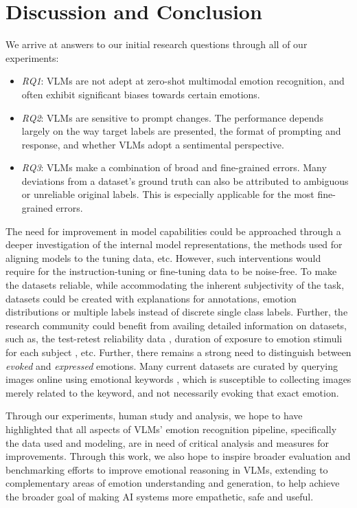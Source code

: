 \section{Discussion and Conclusion}
\label{sec:discussion}

We arrive at answers to our initial research questions through all of our experiments: 

\begin{itemize}
    \item \textit{RQ1}: VLMs are not adept at zero-shot multimodal emotion recognition, and often exhibit significant biases towards certain emotions.
    \item \textit{RQ2}: VLMs are sensitive to prompt changes. The performance depends largely on the way target labels are presented, the format of prompting and response, and whether VLMs adopt a sentimental perspective. 
    \item \textit{RQ3}: VLMs make a combination of broad and fine-grained errors. Many deviations from a dataset's ground truth can also be attributed to ambiguous or unreliable original labels. This is especially applicable for the most fine-grained errors. 
\end{itemize}

The need for improvement in model capabilities could be approached through a deeper investigation of the internal model representations, the methods used for aligning models to the tuning data, etc. However, such interventions would require for the instruction-tuning or fine-tuning data to be noise-free. To make the datasets reliable, while accommodating the inherent subjectivity of the task, datasets could be created with explanations for annotations, emotion distributions or multiple labels instead of discrete single class labels. Further, the research community could benefit from availing detailed information on datasets, such as, the test-retest reliability data \cite{kim2018development}, duration of exposure to emotion stimuli for each subject \cite{lu2017investigation}, etc. Further, there remains a strong need to distinguish between \textit{evoked} and \textit{expressed} emotions. Many current datasets are curated by querying images online using emotional keywords \cite{yang2023emoset}, which is susceptible to collecting images merely related to the keyword, and not necessarily evoking that exact emotion. 

Through our experiments, human study and analysis, we hope to have highlighted that all aspects of VLMs' emotion recognition pipeline, specifically the data used and modeling, are in need of critical analysis and measures for improvements. Through this work, we also hope to inspire broader evaluation and benchmarking efforts to improve emotional reasoning in VLMs, extending to complementary areas of emotion understanding and generation, to help achieve the broader goal of making AI systems more empathetic, safe and useful.



